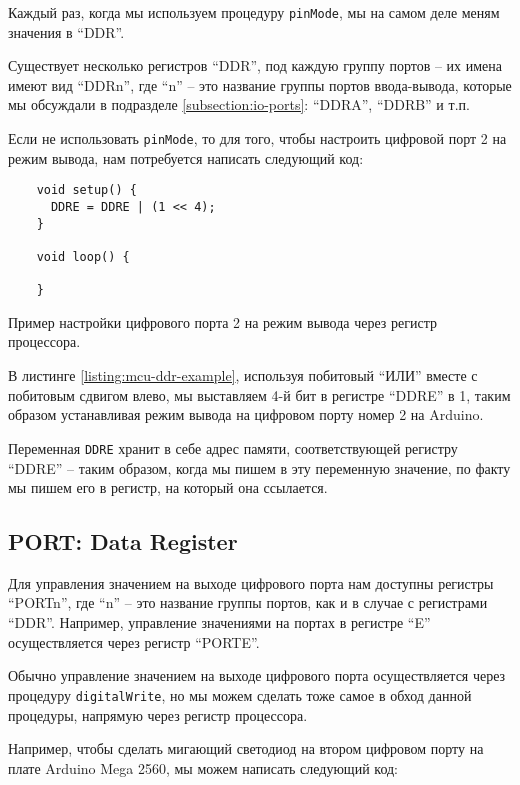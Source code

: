 \documentclass[../sparc.tex]{subfiles}
\begin{document}
Каждый раз, когда мы используем процедуру \texttt{pinMode}, мы на самом
деле меням значения в ``DDR''.

Существует несколько регистров ``DDR'', под каждую группу портов -- их имена
имеют вид ``DDRn'', где ``n'' -- это название группы портов ввода-вывода, которые
мы обсуждали в подразделе \ref{subsection:io-ports}: ``DDRA'', ``DDRB'' и т.п.

Если не использовать \texttt{pinMode}, то для того, чтобы настроить
цифровой порт 2 на режим вывода, нам потребуется написать следующий код:

\begin{listing}[H]
  \begin{verbatim}
    void setup() {
      DDRE = DDRE | (1 << 4);
    }

    void loop() {

    }
  \end{verbatim}
  \caption{Пример настройки цифрового порта 2 на режим вывода через регистр
    процессора.}
  \label{listing:mcu-ddr-example}
\end{listing}

В листинге \ref{listing:mcu-ddr-example}, используя побитовый ``ИЛИ'' вместе с
побитовым сдвигом влево, мы выставляем 4-й бит в регистре ``DDRE'' в 1, таким
образом устанавливая режим вывода на цифровом порту номер 2 на Arduino.

Переменная \texttt{DDRE} хранит в себе адрес памяти, соответствующей
регистру ``DDRE'' -- таким образом, когда мы пишем в эту переменную значение, по
факту мы пишем его в регистр, на который она ссылается.

\subsection{PORT: Data Register}

Для управления значением на выходе цифрового порта нам доступны регистры
``PORTn'', где ``n'' -- это название группы портов, как и в случае с регистрами
``DDR''.  Например, управление значениями на портах в регистре ``E''
осуществляется через регистр ``PORTE''.

Обычно управление значением на выходе цифрового порта осуществляется через
процедуру \texttt{digitalWrite}, но мы можем сделать тоже самое в обход
данной процедуры, напрямую через регистр процессора.

Например, чтобы сделать мигающий светодиод на втором цифровом порту на плате
Arduino Mega 2560, мы можем написать следующий код:
\end{document}
